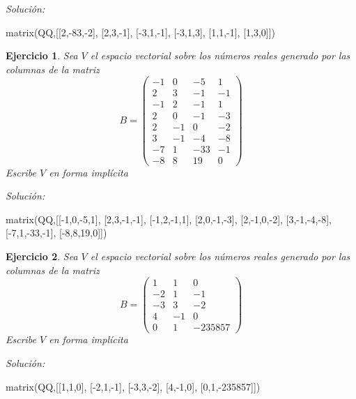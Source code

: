 \documentclass{amsart}
\newtheorem{ejer}{Ejercicio}
\begin{document}
{\it Soluci\'on:}

\begin{sageblock}
matrix(QQ,[[2,-83,-2],
[2,3,-1],
[-3,1,-1],
[-3,1,3],
[1,1,-1],
[1,3,0]])
\end{sageblock}


\begin{ejer} Sea $V$ el espacio vectorial sobre los números reales 
generado por las columnas de la matriz 
\[B = \left(\begin{array}{rrrr}
-1 & 0 & -5 & 1 \\
2 & 3 & -1 & -1 \\
-1 & 2 & -1 & 1 \\
2 & 0 & -1 & -3 \\
2 & -1 & 0 & -2 \\
3 & -1 & -4 & -8 \\
-7 & 1 & -33 & -1 \\
-8 & 8 & 19 & 0
\end{array}\right)\]
Escribe $V$ en forma impl\'icita 
\end{ejer}

{\it Soluci\'on:}

\begin{sageblock}
matrix(QQ,[[-1,0,-5,1],
[2,3,-1,-1],
[-1,2,-1,1],
[2,0,-1,-3],
[2,-1,0,-2],
[3,-1,-4,-8],
[-7,1,-33,-1],
[-8,8,19,0]])
\end{sageblock}



\begin{ejer} Sea $V$ el espacio vectorial sobre los números reales 
generado por las columnas de la matriz 
\[B = \left(\begin{array}{rrr}
1 & 1 & 0 \\
-2 & 1 & -1 \\
-3 & 3 & -2 \\
4 & -1 & 0 \\
0 & 1 & -235857
\end{array}\right)\]
Escribe $V$ en forma impl\'icita 
\end{ejer}

{\it Soluci\'on:}

\begin{sageblock}
matrix(QQ,[[1,1,0],
[-2,1,-1],
[-3,3,-2],
[4,-1,0],
[0,1,-235857]])
\end{sageblock}
\end{document}

